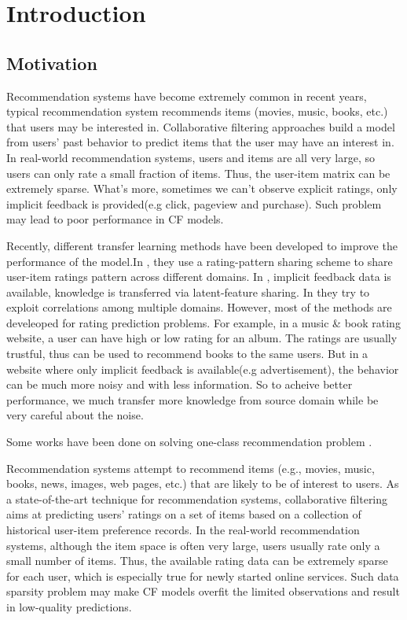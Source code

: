 \chapter{Introduction}
\label{chp:intro}

\hspace{0.1in}
\section{Motivation}
Recommendation systems have become extremely common in recent years, typical recommendation system recommends items (movies, music, books, etc.) that users may be interested in. Collaborative filtering approaches build a model from users' past behavior to predict items that the user may have an interest in. 
In real-world recommendation systems, users and items are all very large, so users can only rate a small fraction of items. Thus, the user-item matrix can be extremely sparse. What's more, sometimes we can't observe explicit ratings, only implicit feedback is provided(e.g click, pageview and purchase). Such problem may lead to poor performance in CF models.

Recently, different transfer learning methods have been developed to improve the performance of the model.In \cite{/ijcai/libin09, /icml/libin09}, they use a rating-pattern sharing scheme to share user-item ratings pattern across different domains. In \cite{/aaai/WPan12, Pan:2011:TLP:2283696.2283784}, implicit feedback data is available, knowledge is transferred via latent-feature sharing. In \cite{/uai/ZhangCY10, DBLP:conf/aaai/EldardiryN11} they try to exploit correlations among multiple domains.
However, most of the methods are develeoped for rating prediction problems. For example, in a music & book rating website, a user can have high or low rating for an album. The ratings are usually trustful, thus can be used to recommend books to the same users. But in a website where only implicit feedback is available(e.g advertisement), the behavior can be much more noisy and with less information. So to acheive better performance, we much transfer more knowledge from source domain while be very careful about the noise.

Some works have been done on solving one-class recommendation problem \cite{4781121, 4781145}. 



Recommendation systems attempt to recommend items (e.g., movies, music, books, news, images, web pages, etc.) that are likely to be of interest to users. As a state-of-the-art technique for recommendation systems, collaborative filtering aims at predicting users' ratings on a set of items based on a collection of historical user-item preference records.
In the real-world recommendation systems, although the item space is often very large, users usually rate only a small number of items. Thus, the available rating data can be extremely sparse for each user, which is especially true for newly started online services.
Such data sparsity problem may make CF models overfit the limited observations and result in low-quality predictions.


